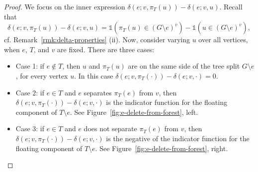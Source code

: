 \documentclass[12pt]{amsart}
\theoremstyle{definition}
\newcommand{\one}{\mathds{1}}
\begin{document}
\begin{proof}
We focus on the inner expression $\delta(e; v, \pi_T(u)) - \delta(e; v, u)$.
Recall that
\begin{equation}\label{eq:delta-diff}
	\delta(e; v, \pi_T(u)) - \delta(e; v, u) 
	= \one(\pi_T(u) \in (G \setminus e)^{\overline v}) - \one( u \in (G \setminus e)^{\overline v}) ,
\end{equation}
cf. Remark~\ref{rmk:delta-properties} (ii).
Now, consider varying $u$ over all vertices, when $e$, $T$, and $v$ are fixed.
There are three cases:

\begin{itemize}[leftmargin=*]
\item Case 1: if $e \not \in T$, then $u$ and $\pi_T(u)$ are on the same side of the tree split $G \setminus e$, for every vertex $u$.
In this case $\delta(e;v, \pi_T(\cdot)) - \delta(e; v, \cdot) = 0$.

\item Case 2: if $e \in T$ and $e$ separates $\pi_T(e)$ from $v$, then $\delta(e;v, \pi_T(\cdot)) - \delta(e; v, \cdot)$ is the indicator function for the floating component of $T \setminus e$. See Figure~\ref{fig:e-delete-from-forest}, left.

\item Case 3: if $e \in T$ and $e$ does not separate $\pi_T(e)$ from $v$, then $\delta(e;v, \pi_T(\cdot)) - \delta(e; v, \cdot)$ is the negative of the indicator function for the floating component of $T \setminus e$. See Figure~\ref{fig:e-delete-from-forest}, right.
\end{itemize}
\begin{figure}[h]
\begin{minipage}{0.45\textwidth}
\centering
\end{minipage}
\begin{minipage}{0.45\textwidth}
\centering
\end{minipage}
\end{figure}
\end{proof}
\end{document}
